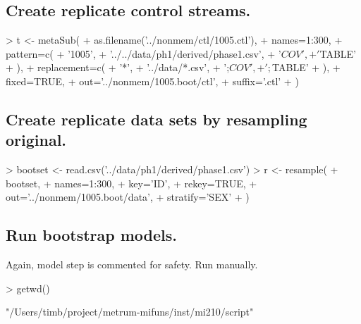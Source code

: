 \subsection{Create replicate control streams.}
\begin{Schunk}
\begin{Sinput}
> t <- metaSub(
+      as.filename('../nonmem/ctl/1005.ctl'),
+      names=1:300,
+      pattern=c(
+          '1005',
+          '../../data/ph1/derived/phase1.csv',
+          '$COV',
+          '$TABLE'
+      ),
+      replacement=c(
+          '*',
+          '../data/*.csv',
+          ';$COV',
+          ';$TABLE'
+     ),
+     fixed=TRUE,
+     out='../nonmem/1005.boot/ctl',
+     suffix='.ctl'
+  )
\end{Sinput}
\end{Schunk}
\subsection{Create replicate data sets by resampling original.}
\begin{Schunk}
\begin{Sinput}
>  bootset <- read.csv('../data/ph1/derived/phase1.csv')
>  r <- resample(
+  	bootset,
+  	names=1:300,
+  	key='ID',
+  	rekey=TRUE,
+  	out='../nonmem/1005.boot/data',
+  	stratify='SEX'
+  )
\end{Sinput}
\end{Schunk}
\subsection{Run bootstrap models.}
Again, model step is commented for safety.  Run manually.
\begin{Schunk}
\begin{Sinput}
> getwd()
\end{Sinput}
\begin{Soutput}
[1] "/Users/timb/project/metrum-mifuns/inst/mi210/script"
\end{Soutput}
\end{Schunk}
